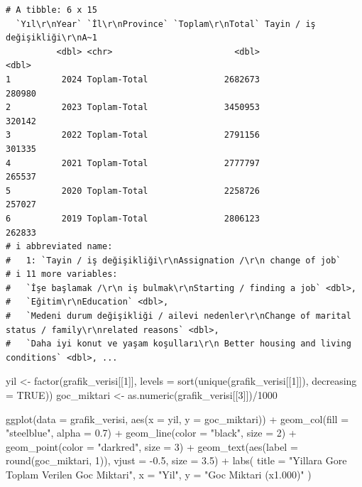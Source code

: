 \documentclass[
  11pt,
  a4paper,
  DIV=11,
  numbers=noendperiod]{scrartcl}
\newenvironment{Shaded}{\begin{snugshade}}{\end{snugshade}}
\newcommand{\AttributeTok}[1]{\textcolor[rgb]{0.40,0.45,0.13}{#1}}
\newcommand{\ConstantTok}[1]{\textcolor[rgb]{0.56,0.35,0.01}{#1}}
\newcommand{\DecValTok}[1]{\textcolor[rgb]{0.68,0.00,0.00}{#1}}
\newcommand{\FloatTok}[1]{\textcolor[rgb]{0.68,0.00,0.00}{#1}}
\newcommand{\FunctionTok}[1]{\textcolor[rgb]{0.28,0.35,0.67}{#1}}
\newcommand{\NormalTok}[1]{\textcolor[rgb]{0.00,0.23,0.31}{#1}}
\newcommand{\OtherTok}[1]{\textcolor[rgb]{0.00,0.23,0.31}{#1}}
\newcommand{\SpecialCharTok}[1]{\textcolor[rgb]{0.37,0.37,0.37}{#1}}
\newcommand{\StringTok}[1]{\textcolor[rgb]{0.13,0.47,0.30}{#1}}
\begin{document}
\begin{verbatim}
# A tibble: 6 x 15
  `Yıl\r\nYear` `İl\r\nProvince` `Toplam\r\nTotal` Tayin / iş değişikliği\r\nA~1
          <dbl> <chr>                        <dbl>                         <dbl>
1          2024 Toplam-Total               2682673                        280980
2          2023 Toplam-Total               3450953                        320142
3          2022 Toplam-Total               2791156                        301335
4          2021 Toplam-Total               2777797                        265537
5          2020 Toplam-Total               2258726                        257027
6          2019 Toplam-Total               2806123                        262833
# i abbreviated name:
#   1: `Tayin / iş değişikliği\r\nAssignation /\r\n change of job`
# i 11 more variables:
#   `İşe başlamak /\r\n iş bulmak\r\nStarting / finding a job` <dbl>,
#   `Eğitim\r\nEducation` <dbl>,
#   `Medeni durum değişikliği / ailevi nedenler\r\nChange of marital status / family\r\nrelated reasons` <dbl>,
#   `Daha iyi konut ve yaşam koşulları\r\n Better housing and living conditions` <dbl>, ...
\end{verbatim}

\begin{Shaded}
\begin{Highlighting}[]
\NormalTok{yil }\OtherTok{\textless{}{-}} \FunctionTok{factor}\NormalTok{(grafik\_verisi[[}\DecValTok{1}\NormalTok{]], }\AttributeTok{levels =} \FunctionTok{sort}\NormalTok{(}\FunctionTok{unique}\NormalTok{(grafik\_verisi[[}\DecValTok{1}\NormalTok{]]), }\AttributeTok{decreasing =} \ConstantTok{TRUE}\NormalTok{))}
\NormalTok{goc\_miktari  }\OtherTok{\textless{}{-}} \FunctionTok{as.numeric}\NormalTok{(grafik\_verisi[[}\DecValTok{3}\NormalTok{]])}\SpecialCharTok{/}\DecValTok{1000}  

\FunctionTok{ggplot}\NormalTok{(}\AttributeTok{data =}\NormalTok{ grafik\_verisi, }\FunctionTok{aes}\NormalTok{(}\AttributeTok{x =}\NormalTok{ yil, }\AttributeTok{y =}\NormalTok{ goc\_miktari)) }\SpecialCharTok{+}
  \FunctionTok{geom\_col}\NormalTok{(}\AttributeTok{fill =} \StringTok{"steelblue"}\NormalTok{, }\AttributeTok{alpha =} \FloatTok{0.7}\NormalTok{) }\SpecialCharTok{+} 
  \FunctionTok{geom\_line}\NormalTok{(}\AttributeTok{color =} \StringTok{"black"}\NormalTok{, }\AttributeTok{size =} \DecValTok{2}\NormalTok{) }\SpecialCharTok{+} 
  \FunctionTok{geom\_point}\NormalTok{(}\AttributeTok{color =} \StringTok{"darkred"}\NormalTok{, }\AttributeTok{size =} \DecValTok{3}\NormalTok{) }\SpecialCharTok{+}
  \FunctionTok{geom\_text}\NormalTok{(}\FunctionTok{aes}\NormalTok{(}\AttributeTok{label =} \FunctionTok{round}\NormalTok{(goc\_miktari, }\DecValTok{1}\NormalTok{)), }\AttributeTok{vjust =} \SpecialCharTok{{-}}\FloatTok{0.5}\NormalTok{, }\AttributeTok{size =} \FloatTok{3.5}\NormalTok{) }\SpecialCharTok{+}
  \FunctionTok{labs}\NormalTok{(}
    \AttributeTok{title =} \StringTok{"Yillara Gore Toplam Verilen Goc Miktari"}\NormalTok{,}
    \AttributeTok{x =} \StringTok{"Yil"}\NormalTok{,}
    \AttributeTok{y =} \StringTok{"Goc Miktari (x1.000)"}
\NormalTok{  )}
\end{Highlighting}
\end{Shaded}
\end{document}
